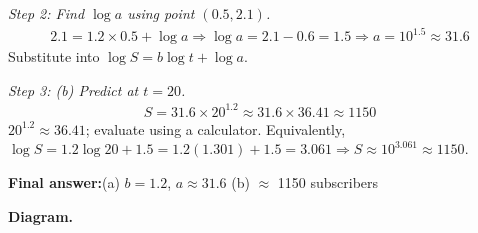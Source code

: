 \documentclass[11pt]{article}
\begin{document}
\textit{Step 2: Find \( \log a \) using point \( (0.5, 2.1) \).}
\[\begin{gathered}
2.1 = 1.2 \times 0.5 + \log a \Rightarrow \log a = 2.1 - 0.6 = 1.5 \Rightarrow a = 10^{1.5} \approx 31.6
\end{gathered}\]
Substitute into \( \log S = b\log t + \log a \).

\textit{Step 3: (b) Predict at \( t = 20 \).}
\[\begin{gathered}
S = 31.6 \times 20^{1.2} \approx 31.6 \times 36.41 \approx 1150
\end{gathered}\]
\( 20^{1.2} \approx 36.41 \); evaluate using a calculator. Equivalently, \( \log S = 1.2\log 20 + 1.5 = 1.2(1.301) + 1.5 = 3.061 \Rightarrow S \approx 10^{3.061} \approx 1150 \).

\begin{answerbox}
\textbf{Final answer:}\quad (a) \(\displaystyle  b = 1.2 \), \(\displaystyle  a \approx 31.6 \) \quad  (b) $\approx$ 1150  subscribers
\end{answerbox}
\textbf{Diagram.}
\end{document}
